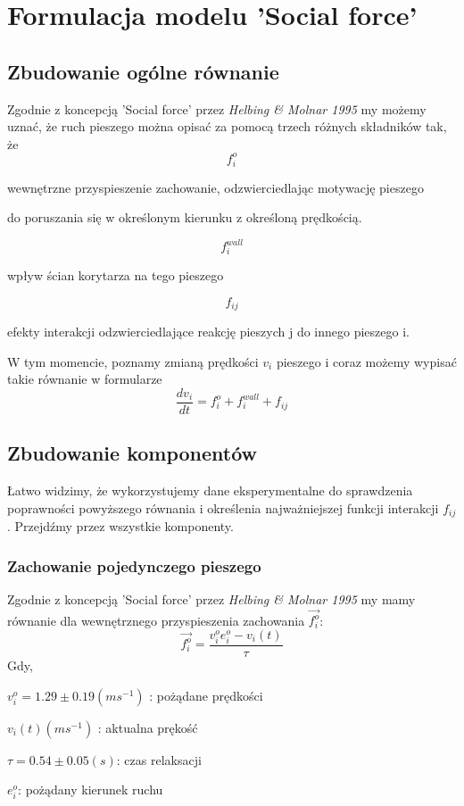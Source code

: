 \documentclass[12pt, a4paper]{report}
\begin{document}
\clearpage 

\tableofcontents

\setlength{\baselineskip}{18pt}
\clearpage 

\clearpage 

\chapter{Formulacja modelu 'Social force'}
\section{Zbudowanie ogólne równanie}
\hspace{4ex}Zgodnie z koncepcją 'Social force' przez {\it Helbing \& Molnar 1995} my możemy uznać, że ruch pieszego można opisać za pomocą trzech różnych składników tak, że 
$$f_{i}^{o}$$  \centerline{wewnętrzne przyspieszenie zachowanie, odzwierciedlając motywację pieszego} \centerline{do poruszania się w określonym kierunku z określoną prędkością.} 
$$f_{i}^{wall}$$ \centerline{wpływ ścian korytarza na tego pieszego}
$$f_{ij}$$ \centerline{efekty interakcji odzwierciedlające reakcję pieszych j do innego pieszego i.}
\par \medskip W tym momencie, poznamy zmianą prędkości $v_{i}$ pieszego i coraz możemy wypisać takie równanie w formularze
$$
\frac{dv_{i}}{dt} = f_{i}^{o} + f_{i}^{wall} + f_{ij}
$$
\section{Zbudowanie komponentów}
\hspace{4ex}Łatwo widzimy, że wykorzystujemy dane eksperymentalne do sprawdzenia poprawności powyższego równania i określenia najważniejszej funkcji interakcji $f_{ij}$. Przejdźmy przez wszystkie komponenty.
\subsection{Zachowanie pojedynczego pieszego}
\hspace{4ex}Zgodnie z koncepcją 'Social force' przez {\it Helbing \& Molnar 1995} my mamy równanie dla wewnętrznego przyspieszenia zachowania $\vec{f_i^o}$:
$$\vec{f_{i}^{o}} = \frac{v_i^oe_i^o-v_{i}(t)}{\tau}$$
Gdy,\\ \centerline{$v_i^o = 1.29 \pm 0.19(ms^{-1})$ : pożądane prędkości}
\centerline{$v_i(t) (ms^{-1})$ : aktualna prękość}
\centerline{$\tau = 0.54 \pm 0.05(s)$: czas relaksacji}
\centerline{$e_i^o$: pożądany kierunek ruchu}
\end{document}

